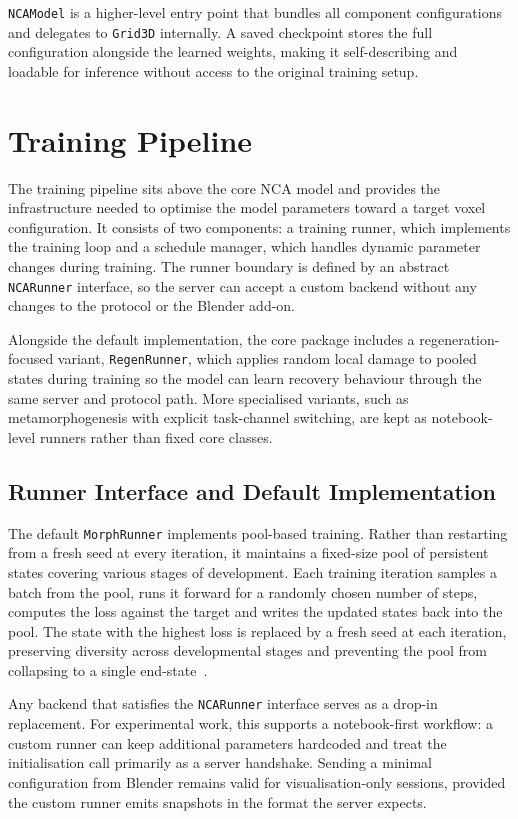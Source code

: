 \texttt{NCAModel} is a higher-level entry point that bundles all component
configurations and delegates to \texttt{Grid3D} internally. A saved checkpoint
stores the full configuration alongside the learned weights, making it
self-describing and loadable for inference without access to the original
training setup.

\section{Training Pipeline}
\label{sec:arch-training}

The training pipeline sits above the core NCA model and provides the
infrastructure needed to optimise the model parameters toward a target voxel
configuration. It consists of two components: a training runner, which
implements the training loop and a schedule manager, which handles dynamic
parameter changes during training. The runner boundary is defined by an
abstract \texttt{NCARunner} interface, so the server can accept a custom
backend without any changes to the protocol or the Blender add-on.

Alongside the default implementation, the core package includes a
regeneration-focused variant, \texttt{RegenRunner}, which applies random local
damage to pooled states during training so the model can learn recovery
behaviour through the same server and protocol path. More specialised variants,
such as metamorphogenesis with explicit task-channel switching, are kept as
notebook-level runners rather than fixed core classes.

\subsection{Runner Interface and Default Implementation}

The default \texttt{MorphRunner} implements pool-based training. Rather than
restarting from a fresh seed at every iteration, it maintains a fixed-size
pool of persistent states covering various stages of development. Each
training iteration samples a batch from the pool, runs it forward for a
randomly chosen number of steps, computes the loss against the target and
writes the updated states back into the pool. The state with the highest loss
is replaced by a fresh seed at each iteration, preserving diversity across
developmental stages and preventing the pool from collapsing to a single
end-state~\cite{Mordvintsev2020}.

Any backend that satisfies the \texttt{NCARunner} interface serves as a
drop-in replacement. For experimental work, this supports a notebook-first
workflow: a custom runner can keep additional parameters hardcoded and treat
the initialisation call primarily as a server handshake. Sending a minimal
configuration from Blender remains valid for visualisation-only sessions,
provided the custom runner emits snapshots in the format the server expects.

